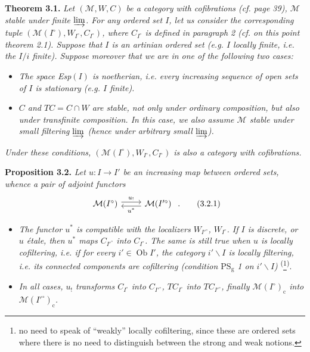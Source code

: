 \documentclass[11pt]{article}
\newcommand{\msp}[1]{\marginpar{\footnotesize [#1]}}
\begin{document}
\msp{50}\textbf{Theorem 3.1.} \textit{Let $(\mathcal{M},W,C)$ be a category with cofibrations (cf. page \textup{39}), $\mathcal{M}$ stable under finite $\varinjlim$. For any ordered set $I$, let us consider the corresponding tuple $(\mathcal{M}(I^\circ),W_{I^\circ},C_{I^\circ})$, where $C_{I^\circ}$ is defined in paragraph \textup{2} (cf. on this point theorem \textup{2.1}). Suppose that $I$ is an \textup{artinian} ordered set (e.g. $I$ locally finite, i.e. the $I/i$ finite). Suppose moreover that we are in one of the following two cases:} %
\begin{itemize}[leftmargin=2.5em]
\item[a)] \textit{The space \textup{Esp}$(I)$ is noetherian, i.e. every increasing sequence of open sets of $I$ is stationary (e.g. $I$ finite).}
\item[b)] \textit{$C$ and $TC=C\cap W$ are stable, not only under ordinary composition, but also under transfinite composition. In this case, we also assume $\mathcal{M}$ stable under small filtering $\varinjlim$ (hence under arbitrary small $\varinjlim$).}
\end{itemize}
\textit{Under these conditions, $(\mathcal{M}(I^\circ),W_{I^\circ},C_{I^\circ})$ is also a category with cofibrations.}

\textbf{Proposition 3.2.} \textit{Let $u:I\longrightarrow I'$ be an increasing map between ordered sets, whence a pair of adjoint functors}
\[
\begin{tikzcd}
\mathcal{M}(I^\circ) \arrow[r, shift left, "u_{!}"] & \mathcal{M}(I'^\circ) \arrow[l, shift left, "u^*"]
\end{tikzcd}\ .
\tag*{(3.2.1)}
\]
\msp{51}
\begin{itemize}[leftmargin=2.5em]
\item[a)] \textit{The functor $u^*$ is compatible with the localizers $W_{I'^\circ}$, $W_{I^\circ}$. If $I$ is discrete, or $u$ étale, then $u^*$ maps $C_{I'^\circ}$ into $C_{I^\circ}$. The same is still true when $u$ is locally cofiltering, i.e. if for every $i'\in\operatorname{Ob}I'$, the category $i'\backslash I$ is locally filtering, i.e. its connected components are cofiltering (condition $\mathrm{PS}_{\mathrm{g}}$ \textup{1} on $i'\backslash I$)} \textsuperscript{(}\footnote[16]{no need to speak of ``weakly'' locally cofiltering, since these are ordered sets where there is no need to distinguish between the strong and weak notions.}\textsuperscript{)}.
\item[b)] \textit{In all cases, $u_!$ transforms $C_{I^\circ}$ into $C_{I'^\circ}$, $TC_{I^\circ}$ into $TC_{I'^\circ}$, finally $\mathcal{M}(I^\circ)_{\mathrm{c}}$ into $\mathcal{M}(I'^\circ)_{\mathrm{c}}$.}
\end{itemize}
\end{document}
